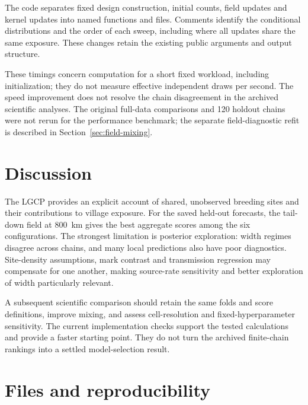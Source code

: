 \documentclass[11pt,a4paper]{article}
\begin{document}
The code separates fixed design construction, initial counts, field updates and kernel updates into named functions and files. Comments identify the conditional distributions and the order of each sweep, including where all updates share the same exposure. These changes retain the existing public arguments and output structure.



These timings concern computation for a short fixed workload, including initialization; they do not measure effective independent draws per second. The speed improvement does not resolve the chain disagreement in the archived scientific analyses. The original full-data comparisons and 120 holdout chains were not rerun for the performance benchmark; the separate field-diagnostic refit is described in Section~\ref{sec:field-mixing}.

\section{Discussion}

The LGCP provides an explicit account of shared, unobserved breeding sites and their contributions to village exposure. For the saved held-out forecasts, the tail-down field at 800~km gives the best aggregate scores among the six configurations. The strongest limitation is posterior exploration: width regimes disagree across chains, and many local predictions also have poor diagnostics. Site-density assumptions, mark contrast and transmission regression may compensate for one another, making source-rate sensitivity and better exploration of width particularly relevant.

A subsequent scientific comparison should retain the same folds and score definitions, improve mixing, and assess cell-resolution and fixed-hyperparameter sensitivity. The current implementation checks support the tested calculations and provide a faster starting point. They do not turn the archived finite-chain rankings into a settled model-selection result.

\appendix
\section{Files and reproducibility}
\end{document}
